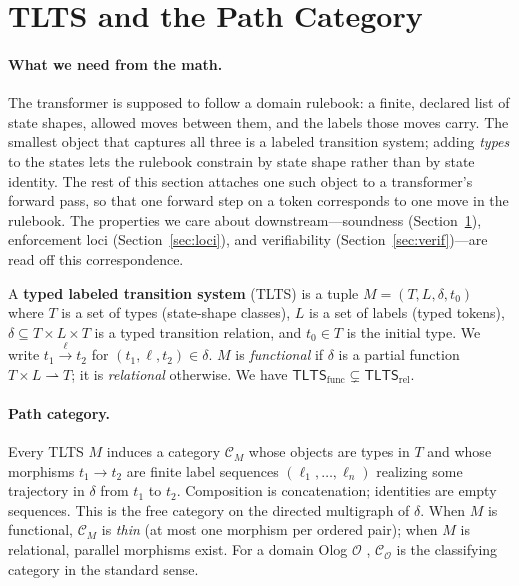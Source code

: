 \documentclass[preprint]{nesy2026}
\begin{document}
\section{TLTS and the Path Category}
\label{sec:formal}

\paragraph{What we need from the math.} The transformer is supposed
to follow a domain rulebook: a finite, declared list of state shapes,
allowed moves between them, and the labels those moves carry. The
smallest object that captures all three is a labeled transition
system; adding \emph{types} to the states lets the rulebook
constrain by state shape rather than by state identity. The rest of
this section attaches one such object to a transformer's forward
pass, so that one forward step on a token corresponds to one move in
the rulebook. The properties we care about downstream---soundness
(Section~\ref{sec:formal}), enforcement loci (Section~\ref{sec:loci}),
and verifiability (Section~\ref{sec:verif})---are read off this
correspondence.

A \textbf{typed labeled transition system} (TLTS) is a tuple $M =
(T, L, \delta, t_0)$ where $T$ is a set of types (state-shape
classes), $L$ is a set of labels (typed tokens), $\delta \subseteq T
\times L \times T$ is a typed transition relation, and $t_0 \in T$
is the initial type. We write $t_1 \stackrel{\ell}{\rightarrow} t_2$
for $(t_1, \ell, t_2) \in \delta$. $M$ is \emph{functional} if
$\delta$ is a partial function $T \times L \rightharpoonup T$; it is
\emph{relational} otherwise. We have
$\mathsf{TLTS}_{\mathrm{func}} \subsetneq
\mathsf{TLTS}_{\mathrm{rel}}$.

\paragraph{Path category.} Every TLTS $M$ induces a category
$\mathcal{C}_M$ whose objects are types in $T$ and whose morphisms
$t_1 \to t_2$ are finite label sequences $(\ell_1, \ldots, \ell_n)$
realizing some trajectory in $\delta$ from $t_1$ to $t_2$.
Composition is concatenation; identities are empty sequences. This
is the free category on the directed multigraph of $\delta$. When
$M$ is functional, $\mathcal{C}_M$ is \emph{thin} (at most one
morphism per ordered pair); when $M$ is relational, parallel
morphisms exist. For a domain Olog $\mathcal{O}$
\citep{spivak2014category}, $\mathcal{C}_\mathcal{O}$ is the
classifying category in the standard sense.
\end{document}
